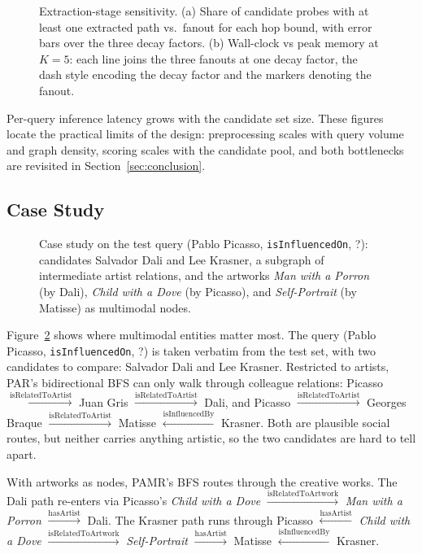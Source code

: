 \documentclass[runningheads]{llncs}
\begin{document}
\begin{figure}[t]
  \centering
  
  \caption{Extraction-stage sensitivity. (a) Share of candidate probes
    with at least one extracted path vs.\ fanout for each hop bound,
    with error bars over the three decay factors. (b) Wall-clock vs
    peak memory at $K = 5$: each line joins the three fanouts at one
  decay factor, the dash style encoding the decay factor and the
  markers denoting the fanout.}
  \label{fig:bfs-sweep}
\end{figure}

Per-query inference latency grows with the candidate set size. These
figures locate the practical limits of the design: preprocessing scales
with query volume and graph density, scoring scales with the candidate
pool, and both bottlenecks are revisited in
Section~\ref{sec:conclusion}.

\subsection{Case Study}
\label{sec:case-study}

\begin{figure}[t]
  \centering
  
  \caption{Case study on the test query (Pablo Picasso,
    \texttt{isInfluencedOn}, ?): candidates Salvador Dali and
    Lee Krasner, a subgraph of intermediate artist relations, and
    the artworks \textit{Man with a Porron} (by Dali),
    \textit{Child with a Dove} (by Picasso), and \textit{Self-Portrait}
  (by Matisse) as multimodal nodes.}
  \label{fig:case-study}
\end{figure}

Figure~\ref{fig:case-study} shows where multimodal entities matter
most. The query (Pablo Picasso, \texttt{isInfluencedOn}, ?) is taken
verbatim from the test set, with two candidates to compare: Salvador
Dali and Lee Krasner. Restricted to artists, PAR's bidirectional BFS
can only walk through colleague relations: Picasso $\xrightarrow{\text{isRelatedToArtist}}$ Juan Gris $\xrightarrow{\text{isRelatedToArtist}}$ Dali, and Picasso $\xrightarrow{\text{isRelatedToArtist}}$ Georges Braque $\xrightarrow{\text{isRelatedToArtist}}$ Matisse $\xleftarrow{\text{isInfluencedBy}}$ Krasner. Both are plausible social routes, but neither carries anything artistic, so the two candidates are hard to tell apart.

With artworks as nodes, PAMR's BFS routes through the creative works. The Dali path re-enters via Picasso's \textit{Child with a Dove} $\xrightarrow{\text{isRelatedToArtwork}}$ \textit{Man with a Porron} $\xrightarrow{\text{hasArtist}}$ Dali. The Krasner path runs through Picasso $\xleftarrow{\text{hasArtist}}$ \textit{Child with a Dove} $\xrightarrow{\text{isRelatedToArtwork}}$ \textit{Self-Portrait} $\xrightarrow{\text{hasArtist}}$ Matisse $\xleftarrow{\text{isInfluencedBy}}$ Krasner.
\end{document}
